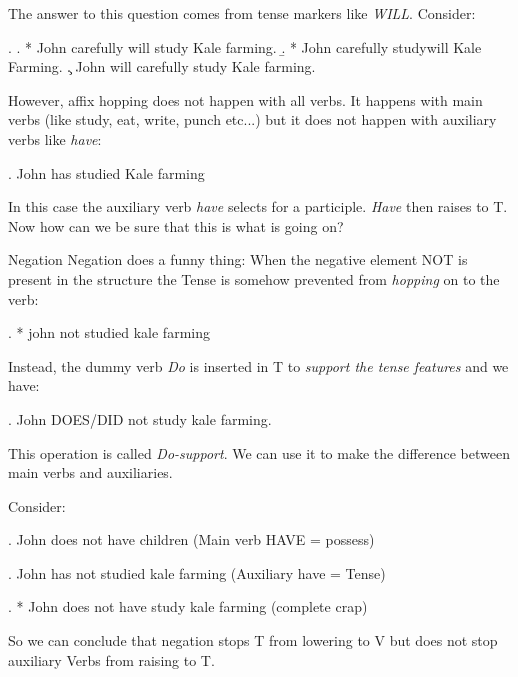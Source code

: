 \begin{frame}
  The answer to this question comes from tense markers like \textit{WILL}.  Consider:

\ex.
\a. * John carefully will study Kale farming.
\b. * John carefully studywill Kale Farming.
\c. John will carefully study Kale farming.

\end{frame}


\begin{frame}
  However, affix hopping does not happen with all verbs.  It happens with main verbs (like study, eat, write, punch etc...) but it does not happen with auxiliary verbs like \textit{have}:

\ex.  John has studied Kale farming


In this case the auxiliary verb \textit{have} selects for a participle.   \textit{Have} then raises to T.  Now how can we be sure that this is what is going on? 


\end{frame}




\begin{frame}
  {Negation}
Negation does a funny thing:  When the negative element NOT is present in the structure the Tense is somehow prevented from \textit{hopping} on to the verb:

\ex. * john not studied kale farming


Instead, the dummy verb \textit{Do} is inserted in T to \textit{support the tense features} and we have:

\ex.
John DOES/DID  not study kale farming.


This operation is called \textit{Do-support}.  We can use it to make the difference between main verbs and auxiliaries. 


\end{frame}




\begin{frame}
  Consider:

\ex.
John does not have children  (Main verb HAVE = possess)

\ex.
John has not studied kale farming (Auxiliary have = Tense)

\ex.
* John does not have study kale farming (complete crap)



\end{frame}

\begin{frame}
  So we can conclude that negation stops T from lowering to V but does not stop auxiliary Verbs from raising to T.
\end{frame}

